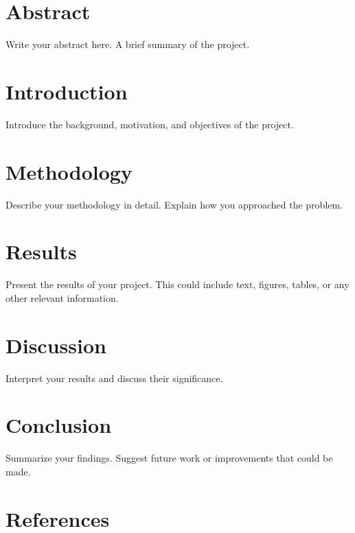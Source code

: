 \documentclass[a4paper,12pt]{article}  %
\begin{document}

\section{Abstract}
Write your abstract here. A brief summary of the project. \cite{einstein1905}

\section{Introduction}
Introduce the background, motivation, and objectives of the project.

\section{Methodology}
Describe your methodology in detail. Explain how you approached the problem.

\section{Results}
Present the results of your project. This could include text, figures, tables, or any other relevant information.

\section{Discussion}
Interpret your results and discuss their significance.

\section{Conclusion}
Summarize your findings. Suggest future work or improvements that could be made.

\section*{References}  %
\printbibliography    %

\end{document}
